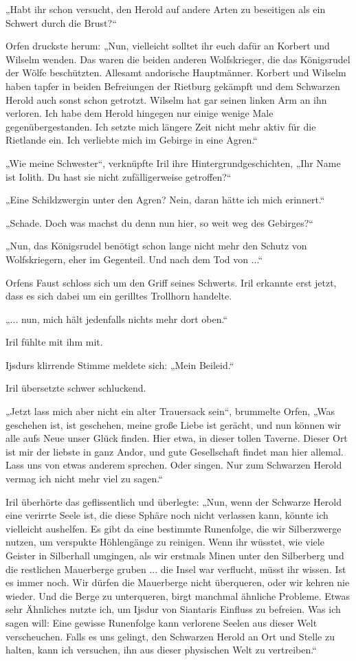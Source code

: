 „Habt ihr schon versucht, den Herold auf andere Arten zu beseitigen als ein Schwert durch die Brust?“

Orfen druckste herum: „Nun, vielleicht solltet ihr euch dafür an Korbert und Wilselm wenden. Das waren die beiden anderen Wolfskrieger, die das Königsrudel der Wölfe beschützten. Allesamt andorische Hauptmänner. Korbert und Wilselm haben tapfer in beiden Befreiungen der Rietburg gekämpft und dem Schwarzen Herold auch sonst schon getrotzt. Wilselm hat gar seinen linken Arm an ihn verloren. Ich habe dem Herold hingegen nur einige wenige Male gegenübergestanden. Ich setzte mich längere Zeit nicht mehr aktiv für die Rietlande ein. Ich verliebte mich im Gebirge in eine Agren.“

„Wie meine Schwester“, verknüpfte Iril ihre Hintergrundgeschichten, „Ihr Name ist Iolith. Du hast sie nicht zufälligerweise getroffen?“

„Eine Schildzwergin unter den Agren? Nein, daran hätte ich mich erinnert.“

„Schade. Doch was machst du denn nun hier, so weit weg des Gebirges?“

„Nun, das Königsrudel benötigt schon lange nicht mehr den Schutz von Wolfskriegern, eher im Gegenteil. Und nach dem Tod von ...“

Orfens Faust schloss sich um den Griff seines Schwerts. Iril erkannte erst jetzt, dass es sich dabei um ein gerilltes Trollhorn handelte.

„... nun, mich hält jedenfalls nichts mehr dort oben.“

Iril fühlte mit ihm mit.

Ijsdurs klirrende Stimme meldete sich: „Mein Beileid.“

Iril übersetzte schwer schluckend.

„Jetzt lass mich aber nicht ein alter Trauersack sein“, brummelte Orfen, „Was geschehen ist, ist geschehen, meine große Liebe ist gerächt, und nun können wir alle aufs Neue unser Glück finden. Hier etwa, in dieser tollen Taverne. Dieser Ort ist mir der liebste in ganz Andor, und gute Gesellschaft findet man hier allemal. Lass uns von etwas anderem sprechen. Oder singen. Nur zum Schwarzen Herold vermag ich nicht mehr viel zu sagen.“

Iril überhörte das geflissentlich und überlegte: „Nun, wenn der Schwarze Herold eine verirrte Seele ist, die diese Sphäre noch nicht verlassen kann, könnte ich vielleicht aushelfen. Es gibt da eine bestimmte Runenfolge, die wir Silberzwerge nutzen, um verspukte Höhlengänge zu reinigen. Wenn ihr wüsstet, wie viele Geister in Silberhall umgingen, als wir erstmals Minen unter den Silberberg und die restlichen Mauerberge gruben ... die Insel war verflucht, müsst ihr wissen. Ist es immer noch. Wir dürfen die Mauerberge nicht überqueren, oder wir kehren nie wieder. Und die Berge zu unterqueren, birgt manchmal ähnliche Probleme. Etwas sehr Ähnliches nutzte ich, um Ijsdur von Siantaris Einfluss zu befreien. Was ich sagen will: Eine gewisse Runenfolge kann verlorene Seelen aus dieser Welt verscheuchen. Falls es uns gelingt, den Schwarzen Herold an Ort und Stelle zu halten, kann ich versuchen, ihn aus dieser physischen Welt zu vertreiben.“

